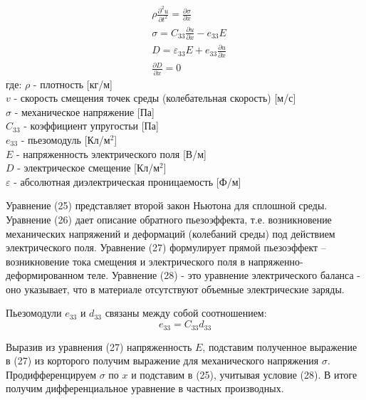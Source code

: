 \documentclass[a4paper, 12pt]{article}
\begin{document}
\begin{align}
	& \rho\frac{\partial^2 u}{\partial t^2}  = \frac{\partial \sigma}{\partial x} \\
	& \sigma  = C_{33}\frac{\partial u}{\partial x} - e_{33}E\\
	& D  = \varepsilon_{33} E + e_{33}\frac{\partial u}{\partial x} \\
	& \frac{\partial D}{\partial x} = 0
\end{align}
где: $\rho$ - плотность [кг/м] \\ 
\hspace*{8mm} $v$ - скорость смещения точек среды (колебательная скорость) [м/с] \\
\hspace*{8mm} $\sigma$ - механическое напряжение [Па] \\
\hspace*{8mm} $C_{33}$ - коэффициент упругостьи [Па] \\
\hspace*{8mm} $e_{33}$ - пьезомодуль  [Кл/м$^2$] \\
\hspace*{8mm} $E$ - напряженность электрического поля [В/м] \\
\hspace*{8mm} $D$ - электрическое смещение [Кл/м$^2$] \\
\hspace*{8mm} $\varepsilon$ - абсолютная диэлектрическая проницаемость [Ф/м] \par 
\vspace{0.5cm}

Уравнение (25) представляет второй закон Ньютона для сплошной среды. Уравнение (26) дает описание обратного пьезоэффекта, т.е. возникновение механических напряжений и деформаций (колебаний среды) под действием электрического поля. Уравнение (27) формулирует прямой пьезоэффект – возникновение тока смещения и электрического поля в напряженно-деформированном теле. Уравнение (28) - это уравнение электрического баланса - оно указывает, что в материале отсутствуют объемные электрические заряды.
 


Пьезомодули $e_{33}$ и $d_{33}$ связаны между собой соотношением:
\begin{equation}
	e_{33} = C_{33} d_{33}
\end{equation}

Выразив из уравнения (27) напряженность $E$, подставим полученное выражение в (27) из корторого получим выражение для механического напряжения $\sigma$. Продифференцируем $\sigma$ по $x$ и подставим в (25), учитывая условие (28). В итоге получим дифференциальное уравнение в частных производных.
\end{document}
